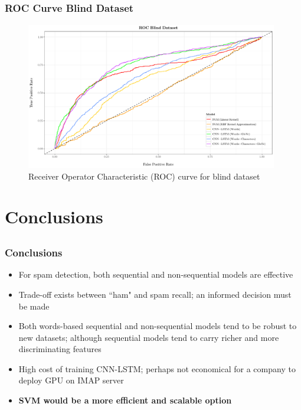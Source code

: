 \documentclass{beamer}
\begin{document}
\subsection{}
\begin{framefont}{\footnotesize}
	\begin{frame}
		\frametitle{ROC Curve Blind Dataset}
		\begin{figure}
			\captionsetup{justification=centering}
			\includegraphics[width=11cm]{roc_blind.pdf}
			\caption{Receiver Operator Characteristic (ROC) curve for blind dataset}
		\end{figure}
	\end{frame}
\end{framefont}

\section{Conclusions}
\subsection{}
\begin{framefont}{\footnotesize}
	\begin{frame}
		\frametitle{Conclusions}
		\begin{itemize}
			\setlength\itemsep{1.2em}
			\item For spam detection, both sequential and non-sequential models are effective
			\item Trade-off exists between ``ham" and spam recall; an informed decision must be made
			\item Both words-based sequential and non-sequential models tend to be robust to new datasets; although sequential models tend to carry richer and more discriminating features
			\item High cost of training CNN-LSTM; perhaps not economical for a company to deploy GPU on IMAP server
			\item \textbf{SVM would be a more efficient and scalable option}
		\end{itemize}
	\end{frame}
\end{framefont}
\end{document}

